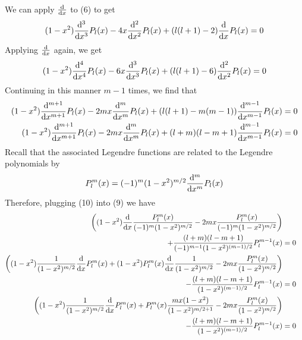 \documentclass[]{book}
\begin{document}
\begin{enumerate}[1)]
\begin{equation}
\begin{split}
\end{split}
\end{equation}
We can apply $\dv{x}$ to (6) to get
\begin{equation}
\begin{split}
(1-x^2)\dv[3]{x} P_l(x) -4x \dv[2]{x} P_l(x) + (l(l+1)-2)\dv{x}P_l(x) = 0
\end{split}
\end{equation}
Applying $\dv{x}$ again, we get
\begin{equation}
\begin{split}
(1-x^2)\dv[4]{x} P_l(x) -6x \dv[3]{x} P_l(x) + (l(l+1)-6)\dv[2]{x}P_l(x) = 0
\end{split}
\end{equation}
Continuing in this manner $m-1$ times, we find that
\begin{equation}
\begin{split}
(1-x^2)\dv[m+1]{x} P_l(x) -2mx \dv[m]{x} P_l(x) + (l(l+1)-m(m-1))\dv[m-1]{x}P_l(x) & = 0 \\
(1-x^2)\dv[m+1]{x} P_l(x) -2mx \dv[m]{x} P_l(x) + (l+m)(l-m+1)\dv[m-1]{x}P_l(x) & = 0
\end{split}
\end{equation}
Recall that the associated Legendre functions are related to the Legendre polynomials by
\begin{equation}
\begin{split}
P_l^m(x) & = (-1)^m(1-x^2)^{m/2} \dv[m]{x} P_l(x) \\
\end{split}
\end{equation}
Therefore, plugging (10) into (9) we have
\begin{equation}
\begin{split}
\left((1-x^2)\dv{x} \frac{P_l^m(x)}{(-1)^m(1-x^2)^{m/2}} -2mx \frac{P_l^m(x) }{(-1)^m(1-x^2)^{m/2}} \right) \\
+ \frac{(l+m)(l-m+1)}{(-1)^{m-1}(1-x^2)^{(m-1)/2}}P_l^{m-1}(x) & = 0 \\
\left((1-x^2)\frac{1}{(1-x^2)^{m/2}}\dv{x}P_l^m(x) +(1-x^2)P_l^m(x)\dv{x} \frac{1}{(1-x^2)^{m/2}} -2mx \frac{P_l^m(x) }{(1-x^2)^{m/2}} \right) \\
-  \frac{(l+m)(l-m+1)}{(1-x^2)^{(m-1)/2}}P_l^{m-1}(x) & = 0\\
\left((1-x^2)\frac{1}{(1-x^2)^{m/2}}\dv{x}P_l^m(x) + P_l^m(x)\frac{mx(1-x^2)}{(1-x^2)^{m/2+1}} -2mx \frac{P_l^m(x) }{(1-x^2)^{m/2}} \right) \\
-  \frac{(l+m)(l-m+1)}{(1-x^2)^{(m-1)/2}}P_l^{m-1}(x) & = 0\\

\end{split}
\end{equation}
\end{enumerate}
\end{document}
